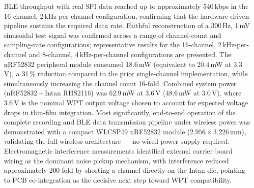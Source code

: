 \documentclass[a4paper,11pt]{article}
\begin{document}
BLE throughput with real SPI data reached up to approximately 540\,kbps in the
16-channel, 2\,kHz-per-channel configuration, confirming that the hardware-driven
pipeline sustains the required data rate. Faithful reconstruction of a 300\,Hz, 1\,mV sinusoidal test signal was confirmed
across a range of channel-count and sampling-rate configurations; representative
results for the 16-channel, 2\,kHz-per-channel and 8-channel, 4\,kHz-per-channel
configurations are presented.
The nRF52832 peripheral module consumed 18.6\,mW (equivalent to 20.4\,mW at 3.3\,V),
a 31\,\% reduction compared to the prior single-channel implementation, while
simultaneously increasing the channel count 16-fold. Combined system power
(nRF52832\,+\,Intan RHS2116) was 62.9\,mW at 3.6\,V (48.6\,mW at 3.0\,V),
where 3.6\,V is the nominal WPT output voltage chosen to account for expected
voltage drops in thin-film integration. Most significantly, end-to-end operation of the complete recording and BLE data
transmission pipeline under wireless power was demonstrated with a compact WLCSP49
nRF52832 module ($2.956\times3.226$\,mm), validating the full wireless architecture ---
no wired power supply required. Electromagnetic interference measurements identified
external carrier board wiring as the dominant noise pickup mechanism, with
interference reduced approximately 200-fold by shorting
a channel directly on the Intan die, pointing to PCB co-integration as the
decisive next step toward WPT compatibility.

\newpage

\null
\thispagestyle{empty}


\newpage

% 


\null
\pagestyle{empty}
\setcounter{tocdepth}{2}
\tableofcontents

\newpage

\null

\newpage


\pagestyle{plain}



\newpage



\newpage



\newpage



\newpage



\newpage

\pagestyle{plain}
\printbibliography
\newpage
\pagestyle{plain}


\end{document}
